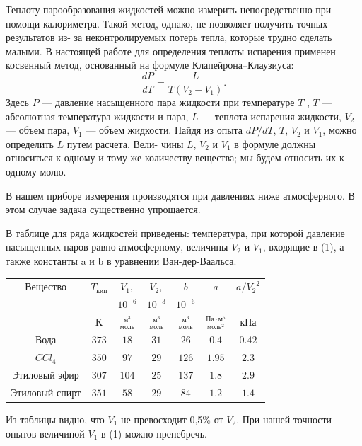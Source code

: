 \documentclass[a4paper, 12pt]{article}
\begin{document}
Теплоту парообразования жидкостей можно измерить непосредственно при помощи 
калориметра. Такой метод, однако, не позволяет получить точных результатов из-
за неконтролируемых потерь тепла, которые трудно сделать малыми. В настоящей 
работе для определения теплоты испарения применен косвенный метод, основанный 
на формуле Клапейрона–Клаузиуса:
\begin{equation}
	\frac{dP}{dT} = \frac{L}{T(V_2-V_1)}.
\end{equation}
Здесь $P$ --- давление насыщенного пара жидкости при температуре
$T$ , $T$ --- абсолютная температура жидкости и пара, $L$ --- теплота испарения жидкости, $V_2$ --- объем пара, $V_1$ --- объем жидкости. Найдя из
опыта $dP/dT$, $T$, $V_2$ и $V_1$, можно определить $L$ путем расчета. Вели-
чины $L$, $V_2$ и $V_1$ в формуле  должны относиться к одному и тому
же количеству вещества; мы будем относить их к одному молю.

В нашем приборе измерения производятся при давлениях ниже
атмосферного. В этом случае задача существенно упрощается.

В таблице для ряда жидкостей приведены: температура, при которой давление насыщенных паров равно атмосферному, величины $V_2$ и $V_1$, входящие в (1), а также константы a и b в уравнении Ван-дер-Ваальса.

\noindent
\begin{tabular}{|c|c|c|c|c|c|c|}
\hline Вещество &  $T_{\text{кип}}$ & $V_1,$ & $V_2,$ & $b$ & $a$ & $a/{V_2}^2$ \\
 &  & $10^{-6}$ & $10^{-3}$ & $10^{-6}$ & & \\
 & K & $\frac{\text{м}^3}{\text{моль}}$ & $\frac{\text{м}^3}{\text{моль}}$ &
 $\frac{\text{м}^3}{\text{моль}}$ & $\frac{\text{Па} \cdot \text{м}^6}{\text{моль}^2}$ & кПа \\
\hline Вода & $373$ & $18$ & $31$ & $26$ & $0.4$ & $0.42$ \\
$CCl_4$ & $350$ & $97$ & $29$ & $126$ & $1.95$ & $2.3$ \\
Этиловый эфир & $307$ & $104$ & $25$ & $137$ & $1.8$ & $2.9$ \\
Этиловый спирт & $351$ & $58$ & $29$ & $84$ & $1.2$ & $1.4$ \\
\hline
\end{tabular}


Из таблицы видно, что $V_1$ не превосходит 0,5\% от $V_2$. При нашей
точности опытов величиной $V_1$ в (1) можно пренебречь.
\end{document}
